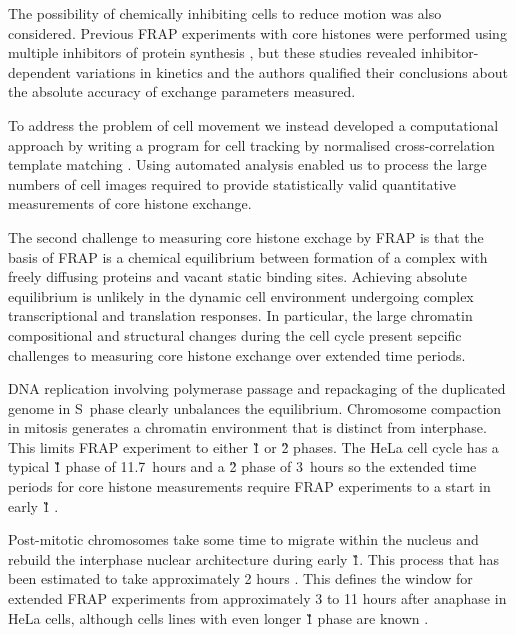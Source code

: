     The possibility of chemically inhibiting cells to reduce motion was also considered.
    Previous FRAP experiments with core histones were performed using multiple inhibitors of protein synthesis \citep{KimuraCook}, 
    but these studies revealed inhibitor-dependent variations in kinetics 
    and the authors qualified their conclusions about the absolute accuracy of exchange parameters measured.

    To address the problem of cell movement we instead developed a computational approach
    by writing a program for cell tracking by normalised cross-correlation template matching  .
    Using automated analysis enabled us to process the large numbers of cell images 
    required to provide statistically valid quantitative measurements of core histone exchange.


    The second challenge to measuring core histone exchage by FRAP is that
    the basis of FRAP is a chemical equilibrium between formation of a complex 
    with freely diffusing proteins and vacant static binding sites.
    Achieving absolute equilibrium is unlikely in the dynamic cell environment
    undergoing complex transcriptional and translation responses.
    In particular, the large chromatin compositional and structural changes during the cell cycle
    present sepcific challenges to measuring core histone exchange over extended time periods.

    DNA replication involving polymerase passage and repackaging of the duplicated genome
    in S~phase clearly unbalances the equilibrium.
    Chromosome compaction in mitosis generates a chromatin environment that is distinct from interphase.
    This limits FRAP experiment to either \G1{} or \G2{} phases.
    The HeLa cell cycle has a typical \G1{} phase of 11.7~hours and a \G2{} phase of 3~hours \citep{HeLaCellCycle}
    so the extended time periods for core histone measurements require FRAP experiments
    to a start in early \G1{} .

    Post-mitotic chromosomes take some time to migrate within the nucleus 
    and rebuild the interphase nuclear architecture during early \G1{}.
    This process that has been estimated to take approximately 2 hours
    \citep{visualizationG1chromosomes,earlyg1position,RelativeChromosomePosition}.
    This defines the window for extended FRAP experiments from approximately 3 to 11 hours after anaphase
    in HeLa cells, although cells lines with even longer \G1{} phase are known \citep{PancreaticCells}.


